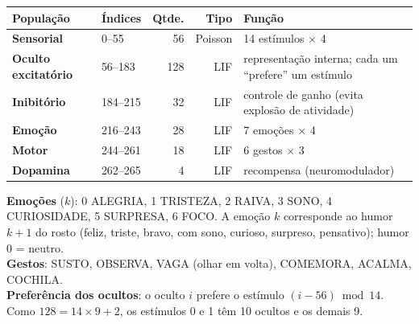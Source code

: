 \documentclass[11pt,a4paper]{article}
\begin{document}
\begin{center}
\begin{tabular}{@{}llrrl@{}}
\toprule
População & Índices & Qtde. & Tipo & Função \\
\midrule
\textcolor{cSen}{\textbf{Sensorial}} & 0–55 & 56 & Poisson & 14 estímulos $\times$ 4 \\
\textcolor{cExc}{\textbf{Oculto excitatório}} & 56–183 & 128 & LIF & representação interna; cada um “prefere” um estímulo \\
\textcolor{cInh}{\textbf{Inibitório}} & 184–215 & 32 & LIF & controle de ganho (evita explosão de atividade) \\
\textcolor{cEmo}{\textbf{Emoção}} & 216–243 & 28 & LIF & 7 emoções $\times$ 4 \\
\textcolor{cMot}{\textbf{Motor}} & 244–261 & 18 & LIF & 6 gestos $\times$ 3 \\
\textcolor{cDa}{\textbf{Dopamina}} & 262–265 & 4 & LIF & recompensa (neuromodulador) \\
\bottomrule
\end{tabular}
\end{center}

\textbf{Emoções} ($k$): 0 ALEGRIA, 1 TRISTEZA, 2 RAIVA, 3 SONO, 4 CURIOSIDADE, 5 SURPRESA, 6 FOCO. A emoção $k$ corresponde ao humor
$k+1$ do rosto (feliz, triste, bravo, com sono, curioso, surpreso, pensativo); humor 0 = neutro.\\
\textbf{Gestos}: SUSTO, OBSERVA, VAGA (olhar em volta), COMEMORA, ACALMA, COCHILA.\\
\textbf{Preferência dos ocultos}: o oculto $i$ prefere o estímulo $(i - 56) \bmod 14$. Como $128 = 14 \times 9 + 2$, os estímulos 0 e 1
têm 10 ocultos e os demais 9.
\end{document}
